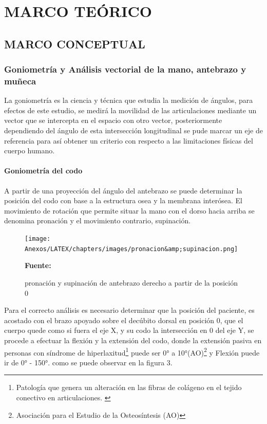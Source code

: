 \chapter{MARCO TEÓRICO}

\section{MARCO CONCEPTUAL}
\subsection{Goniometría y Análisis vectorial de la mano, antebrazo y muñeca}
La goniometría es la ciencia y técnica que estudia la medición de ángulos, para efectos de este estudio, se medirá la movilidad de las articulaciones mediante un vector que se intercepta en el espacio con otro vector, posteriormente dependiendo del ángulo de esta intersección longitudinal se pude marcar un eje de referencia para así obtener un criterio con respecto a las limitaciones físicas del cuerpo humano.  \parencite{Taboadela2007TaboadelaLaborales.}

\subsubsection{Goniometría del codo}
A partir de una proyección del ángulo del antebrazo se puede determinar la posición del codo con base a la estructura osea y la membrana interósea. El movimiento de rotación que permite situar la mano con el dorso hacia arriba se denomina pronación y el movimiento contrario, supinación. \parencite{Taboadela2007TaboadelaLaborales.} 

\begin{figure}[H]
    \centering
    \texttt{[image: Anexos/LATEX/chapters/images/pronacion\&amp;supinacion.png]}
    \caption{pronación y supinación de antebrazo derecho a partir de la posición 0}
    \small{\textbf{Fuente:} \parencite{Taboadela2007TaboadelaLaborales.} }
    \label{GONIOMETRIA_CODO_0}
\end{figure}


Para el correcto análisis es necesario determinar que la posición del paciente, es acostado con el brazo apoyado sobre el decúbito dorsal en posición 0, que el cuerpo quede como si fuera el eje X, y su codo la intersección en 0 del eje Y, se procede a efectuar la flexión y la extensión del codo, donde la extensión pasiva en personas con síndrome de hiperlaxitud\footnote{Patología que genera un alteración en las fibras de colágeno en el tejido conectivo en articulaciones. \parencite[1]{PedroRevistaClinic}} puede ser 0° a 10°(AO)\footnote{Asociación para el Estudio de la Osteosíntesis (AO)} y  Flexión puede ir de 0° - 150°. como se puede observar en la figura 3.

